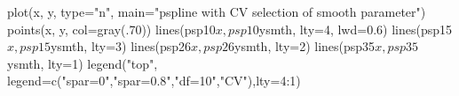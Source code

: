 \begin{Schunk}
\begin{Sinput}
 plot(x, y, type="n", main="pspline with CV selection of smooth parameter")
 points(x, y, col=gray(.70))
 lines(psp10$x, psp10$ysmth, lty=4, lwd=0.6)
 lines(psp15$x, psp15$ysmth, lty=3)
 lines(psp26$x, psp26$ysmth, lty=2)
 lines(psp35$x, psp35$ysmth, lty=1)
 legend("top", legend=c("spar=0","spar=0.8","df=10","CV"),lty=4:1)
\end{Sinput}
\end{Schunk}
